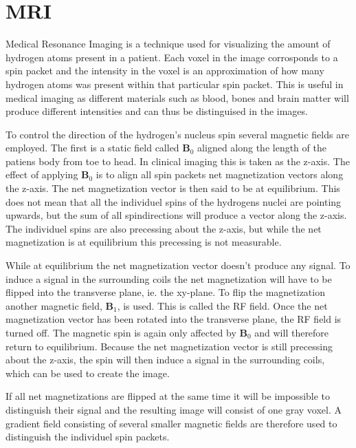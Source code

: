 \section{MRI}
\label{sec:MRI}


Medical Resonance Imaging is a technique used for visualizing the
amount of hydrogen atoms present in a patient. Each voxel in the image
corrosponds to a spin packet and the intensity in the voxel is an
approximation of how many hydrogen atoms was present within that
particular spin packet. This is useful in medical imaging as different
materials such as blood, bones and brain matter will produce different
intensities and can thus be distinguised in the images.


To control the direction of the hydrogen's nucleus spin several
magnetic fields are employed. The first is a static field called
$\mathbf{B}_0$ aligned along the length of the patiens body from toe
to head. In clinical imaging this is taken as the z-axis. The effect
of applying $\mathbf{B}_0$ is to align all spin packets net
magnetization vectors along the z-axis. The net magnetization vector
is then said to be at equilibrium. This does not mean that all the
individuel spins of the hydrogens nuclei are pointing upwards, but the
sum of all spindirections will produce a vector along the z-axis. The
individuel spins are also precessing about the z-axis, but while the
net magnetization is at equilibrium this precessing is not measurable.


While at equilibrium the net magnetization vector doesn't produce any
signal. To induce a signal in the surrounding coils the net
magnetization will have to be flipped into the transverse plane,
ie. the xy-plane. To flip the magnetization another magnetic field,
$\mathbf{B}_1$, is used. This is called the RF field. Once the net
magnetization vector has been rotated into the transverse plane, the
RF field is turned off. The magnetic spin is again only affected by
$\mathbf{B}_0$ and will therefore return to equilibrium. Because the
net magnetization vector is still precessing about the z-axis, the
spin will then induce a signal in the surrounding coils, which can be
used to create the image.


If all net magnetizations are flipped at the same time it will be
impossible to distinguish their signal and the resulting image will
consist of one gray voxel. A gradient field consisting of several
smaller magnetic fields are therefore used to distinguish the
individuel spin packets.

